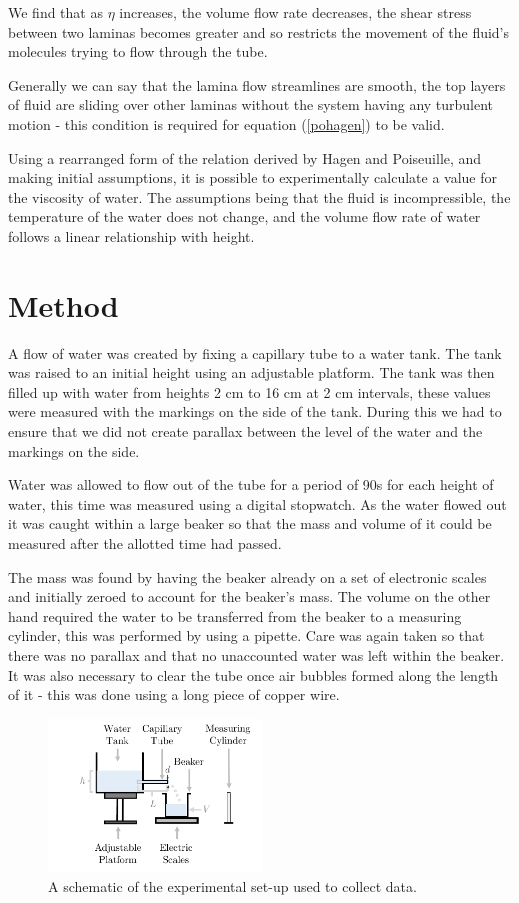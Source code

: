 \documentclass[twocolumn]{revtex4}
\begin{document}
We find that as $\eta$ increases, the volume flow rate decreases, the shear stress between two laminas becomes greater and so restricts the movement of the fluid's molecules trying to flow through the tube. 

Generally we can say that the lamina flow streamlines are smooth, the top layers of fluid are sliding over other laminas without the system having any turbulent motion - this condition is required for equation (\ref{pohagen}) to be valid. 

Using a rearranged form of the relation derived by Hagen and Poiseuille, and making initial assumptions, it is possible to experimentally calculate a value for the viscosity of water. The assumptions being that the fluid is incompressible, the temperature of the water does not change, and the volume flow rate of water follows a linear relationship with height.

\vspace{-3ex}
\section{Method} 
\vspace{-2ex}
A flow of water was created by fixing a capillary tube to a water tank. The tank was raised to an initial height using an adjustable platform. The tank was then filled up with water from heights 2 cm to 16 cm at 2 cm intervals, these values were measured with the markings on the side of the tank. During this we had to ensure that we did not create parallax between the level of the water and the markings on the side. 

Water was allowed to flow out of the tube for a period of 90s for each height of water, this time was measured using a digital stopwatch. As the water flowed out it was caught within a large beaker so that the mass and volume of it could be measured after the allotted time had passed. 

The mass was found by having the beaker already on a set of electronic scales and initially zeroed to account for the beaker's mass. The volume on the other hand required the water to be transferred from the beaker to a measuring cylinder, this was performed by using a pipette. Care was again taken so that there was no parallax and that no unaccounted water was left within the beaker. It was also necessary to clear the tube once air bubbles formed along the length of it - this was done using a long piece of copper wire. 

\begin{figure}[!h]
\begin{center}
\includegraphics[width=5.7cm]{fig1}
\caption[]{A schematic of the experimental set-up used to collect data. }
\label{fig:fig1}
\end{center}
\end{figure}
\end{document}
